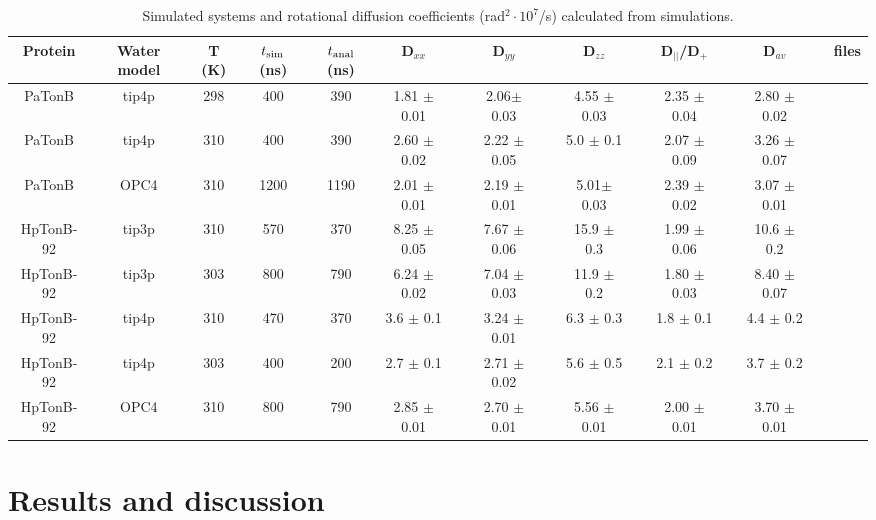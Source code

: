 \documentclass[pre,aps,floatfix,authordate1-4,twocolumn]{revtex4-1}
\begin{document}
\begin{table}[htb]
\centering
\caption{Simulated systems and rotational diffusion coefficients (rad$^2\cdot 10^7$/s) calculated from simulations.
}\label{ROTdiffCOEFFS}
\begin{tabular}{c c c c c c c c c c c c c c c c}
Protein     & Water model & T (K)  &  $t_{\rm sim}$ (ns)   &  $t_{\rm anal}$ (ns)   & D$_{xx}$ &&D$_{yy}$ &&D$_{zz}$ &&D$_{||}$/D$_+$ & &D$_{av}$& &files \\
\hline
PaTonB      & tip4p       & 298    & 400                 &  390                 & 1.81 $\pm$ 0.01 && 2.06$\pm$ 0.03 && 4.55 $\pm$ 0.03 && 2.35 $\pm$ 0.04 && 2.80 $\pm$ 0.02 && \cite{??} \\
PaTonB      & tip4p       & 310    & 400                 &  390                 &  2.60 $\pm$ 0.02 &&  2.22 $\pm$ 0.05& &  5.0  $\pm$ 0.1  & &  2.07 $\pm$ 0.09& &   3.26 $\pm$  0.07 && \cite{??}\\
PaTonB      & OPC4        & 310    & 1200                &  1190                &  2.01 $\pm$ 0.01 && 2.19 $\pm$ 0.01 && 5.01$\pm$ 0.03 && 2.39 $\pm$ 0.02 && 3.07 $\pm$ 0.01 && \cite{??}  \\
HpTonB-92   & tip3p       & 310    & 570           	 &  370                 & 8.25 $\pm$ 0.05 && 7.67 $\pm$ 0.06 && 15.9 $\pm$ 0.3 && 1.99 $\pm$ 0.06 &&  10.6 $\pm$ 0.2 &&  \cite{??} \\
HpTonB-92   & tip3p       & 303    & 800           	 &  790                 & 6.24 $\pm$ 0.02 && 7.04 $\pm$ 0.03 && 11.9 $\pm$ 0.2 && 1.80 $\pm$ 0.03 && 8.40 $\pm$ 0.07 && \cite{??} \\
HpTonB-92   & tip4p       & 310    & 470           	 &  370                 & 3.6 $\pm$ 0.1 && 3.24 $\pm$ 0.01 && 6.3 $\pm$ 0.3 && 1.8 $\pm$ 0.1 && 4.4 $\pm$ 0.2 && \cite{??} \\
HpTonB-92   & tip4p       & 303    & 400           	 &  200                 & 2.7 $\pm$ 0.1 && 2.71 $\pm$ 0.02 && 5.6 $\pm$ 0.5 && 2.1 $\pm$ 0.2 && 3.7 $\pm$ 0.2 && \cite{??} \\
HpTonB-92   & OPC4        & 310    & 800           	 &  790                 & 2.85 $\pm$ 0.01 && 2.70 $\pm$ 0.01 && 5.56 $\pm$ 0.01 && 2.00 $\pm$ 0.01 && 3.70 $\pm$ 0.01 && \cite{??} \\
\end{tabular}
\end{table}

\section{Results and discussion}
\end{document}
